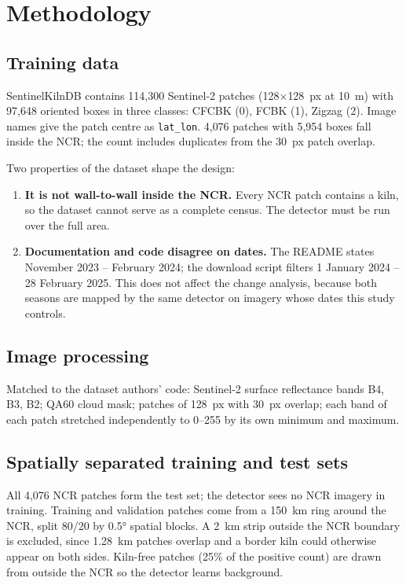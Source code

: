 \documentclass[11pt,a4paper]{article}
\begin{document}
\section{Methodology}

\subsection{Training data}
SentinelKilnDB contains 114{,}300 Sentinel-2 patches (128$\times$128~px at 10~m)
with 97{,}648 oriented boxes in three classes: CFCBK (0), FCBK (1), Zigzag (2).
Image names give the patch centre as \texttt{lat\_lon}. 4{,}076 patches with
5{,}954 boxes fall inside the NCR; the count includes duplicates from the 30~px
patch overlap.

Two properties of the dataset shape the design:
\begin{enumerate}[leftmargin=*]
\item \textbf{It is not wall-to-wall inside the NCR.} Every NCR patch contains a
kiln, so the dataset cannot serve as a complete census. The detector must be run
over the full area.
\item \textbf{Documentation and code disagree on dates.} The README states
November 2023 -- February 2024; the download script filters 1 January 2024 --
28 February 2025. This does not affect the change analysis, because both seasons
are mapped by the same detector on imagery whose dates this study controls.
\end{enumerate}

\subsection{Image processing}
Matched to the dataset authors' code: Sentinel-2 surface reflectance bands B4,
B3, B2; QA60 cloud mask; patches of 128~px with 30~px overlap; each band of each
patch stretched independently to 0--255 by its own minimum and maximum.

\subsection{Spatially separated training and test sets}
All 4{,}076 NCR patches form the test set; the detector sees no NCR imagery in
training. Training and validation patches come from a 150~km ring around the NCR,
split 80/20 by 0.5° spatial blocks. A 2~km strip outside the NCR boundary is
excluded, since 1.28~km patches overlap and a border kiln could otherwise appear
on both sides. Kiln-free patches (25\% of the positive count) are drawn from
outside the NCR so the detector learns background.
\end{document}
